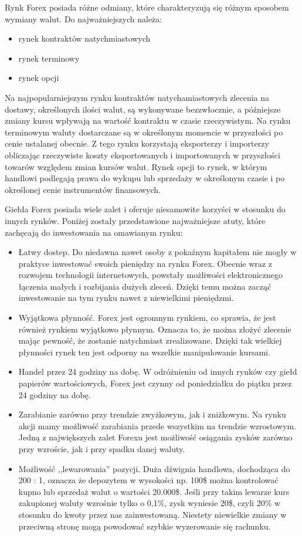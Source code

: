 \documentclass[pdflatex,11pt]{aghdpl}
\begin{document}
Rynk Forex posiada różne odmiany, które charakteryzują się różnym sposobem wymiany walut. Do najważniejszych należa:
\begin{itemize}
\item rynek kontraktów natychmiastowych
\item rynek terminowy
\item rynek opcji
\end{itemize}

Na najpopularniejszym rynku kontraktów natychamiastowych zlecenia na dostawy, określonych ilości walut, są wykonywane bezzwłocznie, a późniejsze zmiany kursu wpływają na wartość kontraktu w czasie rzeczywistym. Na rynku terminowym waluty dostarczane są w określonym momencie w przyszłości po cenie ustalanej obecnie. Z tego rynku korzystają eksporterzy i importerzy obliczając rzeczywiste koszty eksportowanych i importowanych w przyszłości towarów względem zmian kursów walut. Rynek opcji to rynek, w którym handlowi podlegają prawa do wykupu lub sprzedaży w określonym czasie i po określonej cenie instrumentów finansowych. 

Giełda Forex posiada wiele zalet i oferuje niesamowite korzyści w stosunku do innych rynków. Poniżej zostały przedstawione najważniejsze atuty, które zachęcają do inwestowania na omawianym rynku:
\begin{itemize}
\item Łatwy dostep. 
Do niedawna nawet osoby z pokaźnym kapitałem nie mogły w praktyce inwestować swoich pieniędzy na rynku Forex. Obecnie wraz z rozwojem technologii internetowych, powstały możliwości elektronicznego łączenia małych i rozbijania dużych zleceń. Dzięki temu można zacząć inwestowanie na tym rynku nawet z niewielkimi pieniędzmi.
\item Wyjątkowa płynność. 
Forex jest ogromnym rynkiem, co sprawia, że jest również rynkiem wyjątkowo płynnym. Oznacza to, że można złożyć zlecenie mając pewność, że zostanie natychmiast zrealizowane. Dzięki tak wielkiej płynności rynek ten jest odporny na wszelkie manipulowanie kursami.
\item Handel przez 24 godziny na dobę. 
W odróżnieniu od innych rynków czy giełd papierów wartościowych, Forex jest czynny od poniedziałku do piątku przez 24 godziny na dobę. 
\item Zarabianie zarówno przy trendzie zwyżkowym, jak i zniżkowym.
Na rynku akcji mamy możliwość zarabiania przede wszystkim na trendzie wzrostowym. Jedną z największych zalet Forexu jest możliwość osiągania zysków zarówno przy wzroście, jak i przy spadku danej waluty.
\item Możliwość ,,lewarowania'' pozycji.
Duża dźwignia handlowa, dochodząca do 200 : 1, oznacza że depozytem w wysokości np. 100\$ można kontrolować kupno lub sprzedaż walut o wartości 20.000\$. Jeśli przy takim lewarze kurs zakupionej waluty wzrośnie tylko o 0,1\%, zysk wyniesie 20\$, czyli 20\% w stosunku do kwoty przez nas zainwestowaną. Niestety niewielkie zmiany w przeciwną stronę mogą powodować szybkie wyzerowanie się rachunku.
\end{itemize}
\end{document}
